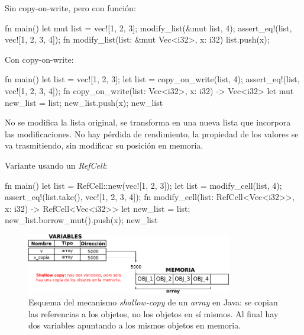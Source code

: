 Sin copy-on-write, pero con función:

\vspace{0.7em}
\begin{Codigo}
   fn main() {
      let mut list = vec![1, 2, 3];
      modify_list(&mut list, 4);
      assert_eq!(list, vec![1, 2, 3, 4]);
   }
   fn modify_list(list: &mut Vec<i32>, x: i32) {
      list.push(x);
   }
\end{Codigo}

Con copy-on-write:

\vspace{0.7em}
\begin{Codigo}
   fn main() {
      let list = vec![1, 2, 3];
      let list = copy_on_write(list, 4);
      assert_eq!(list, vec![1, 2, 3, 4]);
   }
   fn copy_on_write(list: Vec<i32>, x: i32) -> Vec<i32> {
      let mut new_list = list;
      new_list.push(x);
      new_list
   }
\end{Codigo}

No se modifica la lista original, se transforma en una nueva lista que incorpora las modificaciones. No hay pérdida de rendimiento, la propiedad de los valores se va trasmitiendo, sin modificar su posición en memoria.

Variante usando un \textit{RefCell}:

\vspace{0.7em}
\begin{Codigo}
   fn main() {
      let list = RefCell::new(vec![1, 2, 3]);
      let list = modify_cell(list, 4);
      assert_eq!(list.take(), vec![1, 2, 3, 4]);
   }
   fn modify_cell(list: RefCell<Vec<i32>>, x: i32) 
   -> RefCell<Vec<i32>> {
      let new_list = list;
      new_list.borrow_mut().push(x);
      new_list
   }
\end{Codigo}

\vspace{0.7em}
\begin{figure}[htb]
   \begin{center}
      \includegraphics[width=0.8\textwidth]{img/shallow_copy.png}
      \caption{Esquema del mecanismo \textit{shallow-copy} de un \textit{array} en Java: se copian las referencias a los objetos, no los objetos en sí mismos. Al final hay dos variables apuntando a los mismos objetos en memoria.}
      \label{fig_shallow_copy_1}
   \end{center}
\end{figure}


